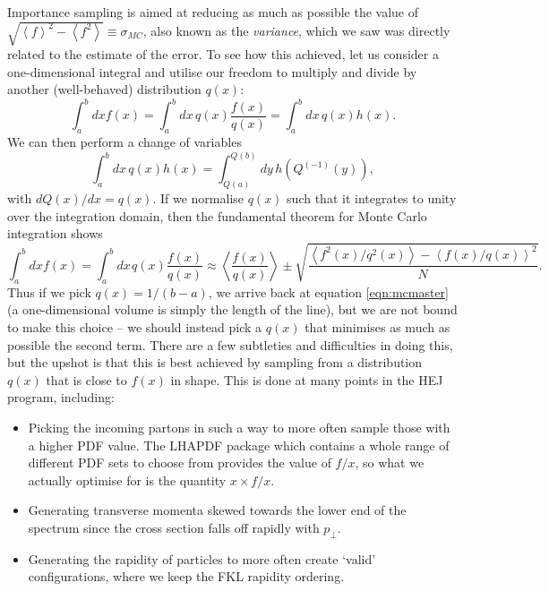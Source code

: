 Importance sampling is aimed at reducing as much as possible the value of $\sqrt{\left<f \right>^2 - \left<f^2 \right>} \equiv \sigma_{MC}$, also known as the \emph{variance}, which we saw was directly related to the estimate of the error. To see how this achieved, let us consider a one-dimensional integral and utilise our freedom to multiply and divide by another (well-behaved) distribution $q(x)$:
\begin{equation}
\int_a^b dx f(x) = \int_a^b dx \hspace{2pt} q(x) \frac{f(x)}{q(x)} = \int_a^b dx \hspace{2pt} q(x) h(x).
\end{equation}
We can then perform a change of variables
\begin{equation}
\int_a^b dx \hspace{2pt} q(x) h(x) = \int_{Q(a)}^{Q(b)} dy \hspace{2pt} h \left(Q^{(-1)}(y) \right),
\end{equation}
with $dQ(x)/dx = q(x)$. If we normalise $q(x)$ such that it integrates to unity over the integration domain, then the fundamental theorem for Monte Carlo integration shows
\begin{equation}
\int_a^b dx f(x) = \int_a^b dx \hspace{1pt} q(x) \frac{f(x)}{q(x)} \approx \left< \frac{f(x)}{q(x)} \right> \pm \sqrt{\frac{\left<f^2(x)/q^2(x)\right> - \left<f(x)/q(x) \right>^2}{N}}.
\end{equation} 
Thus if we pick $q(x) = 1/(b-a)$, we arrive back at equation \ref{eqn:mcmaster} (a one-dimensional volume is simply the length of the line), but we are not bound to make this choice -- we should instead pick a $q(x)$ that minimises as much as possible the second term. There are a few subtleties and difficulties in doing this, but the upshot is that this is best achieved by sampling from a distribution $q(x)$ that is close to $f(x)$ in shape. This is done at many points in the HEJ program, including:

\begin{itemize} 
\item{Picking the incoming partons in such a way to more often sample those with a higher PDF value. The LHAPDF package \cite{Buckley2014} which contains a whole range of different PDF sets to choose from provides the value of $f/x$, so what we actually optimise for is the quantity $x \times f/x$.}
\item{Generating transverse momenta skewed towards the lower end of the spectrum since the cross section falls off rapidly with $p_\perp$.}
\item{Generating the rapidity of particles to more often create `valid' configurations, where we keep the FKL rapidity ordering.}
\end{itemize}

